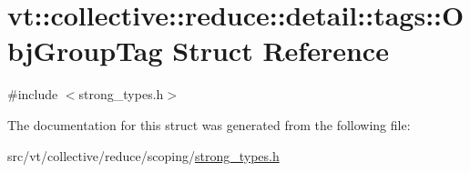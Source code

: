 \hypertarget{structvt_1_1collective_1_1reduce_1_1detail_1_1tags_1_1_obj_group_tag}{}\section{vt\+:\+:collective\+:\+:reduce\+:\+:detail\+:\+:tags\+:\+:Obj\+Group\+Tag Struct Reference}
\label{structvt_1_1collective_1_1reduce_1_1detail_1_1tags_1_1_obj_group_tag}


{\ttfamily \#include $<$strong\+\_\+types.\+h$>$}



The documentation for this struct was generated from the following file\+:\begin{DoxyCompactItemize}
\item 
src/vt/collective/reduce/scoping/\hyperlink{strong__types_8h}{strong\+\_\+types.\+h}\end{DoxyCompactItemize}
